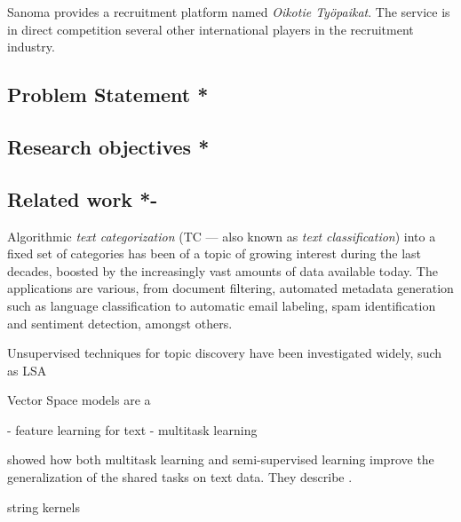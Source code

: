 Sanoma provides a recruitment platform named \emph{Oikotie Työpaikat}. The service is in direct competition several other international players in the recruitment industry.

\subsection{Problem Statement *}



\subsection{Research objectives *}

\subsection{Related work *-}


Algorithmic \emph{text categorization} (TC --- also known as \emph{text classification}) into a fixed set of categories has been of a topic of growing interest during the last decades, boosted by the increasingly vast amounts of data available today. The applications are various, from document filtering, automated metadata generation such as language classification to automatic email labeling, spam identification and sentiment detection, amongst others.

Unsupervised techniques for topic discovery have been investigated widely, such as LSA

Vector Space models are a

- feature learning for text
- multitask learning


\cite{Collobert:2008aa} showed how both multitask learning and semi-supervised learning improve the generalization of the shared tasks on text data. They describe .

\cite{Lodhi:2002aa} string kernels

